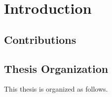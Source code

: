 \chapter{Introduction}

\section{Contributions}
\label{sec:contribution}

\section{Thesis Organization}
\label{sec:organization}

This thesis is organized as follows.